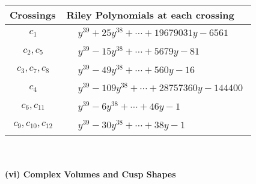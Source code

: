 \documentclass[1p]{elsarticle_modified}
\theoremstyle{definition}
\begin{document}
\begin{tabular}{m{50pt}|m{274pt}}
Crossings & \hspace{64pt}Riley Polynomials at each crossing \\
\hline $$\begin{aligned}c_{1}\end{aligned}$$&$\begin{aligned}
&y^{39}+25 y^{38}+\cdots+19679031 y-6561
\end{aligned}$\\
\hline $$\begin{aligned}c_{2},c_{5}\end{aligned}$$&$\begin{aligned}
&y^{39}-15 y^{38}+\cdots+5679 y-81
\end{aligned}$\\
\hline $$\begin{aligned}c_{3},c_{7},c_{8}\end{aligned}$$&$\begin{aligned}
&y^{39}-49 y^{38}+\cdots+560 y-16
\end{aligned}$\\
\hline $$\begin{aligned}c_{4}\end{aligned}$$&$\begin{aligned}
&y^{39}-109 y^{38}+\cdots+28757360 y-144400
\end{aligned}$\\
\hline $$\begin{aligned}c_{6},c_{11}\end{aligned}$$&$\begin{aligned}
&y^{39}-6 y^{38}+\cdots+46 y-1
\end{aligned}$\\
\hline $$\begin{aligned}c_{9},c_{10},c_{12}\end{aligned}$$&$\begin{aligned}
&y^{39}-30 y^{38}+\cdots+38 y-1
\end{aligned}$\\
\hline
\end{tabular}\\~\\
\newpage\flushleft \textbf{(vi) Complex Volumes and Cusp Shapes}
\end{document}
